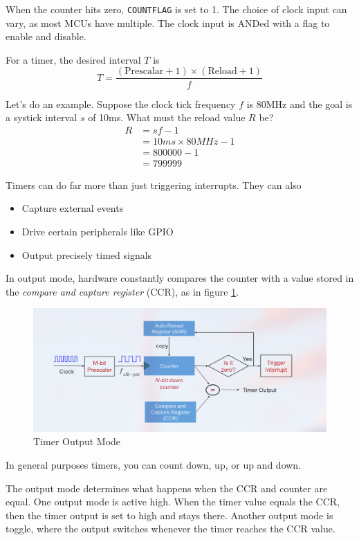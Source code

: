When the counter hits zero, \texttt{COUNTFLAG} is set to 1.
The choice of clock input can vary, as most MCUs have multiple.
The clock input is ANDed with a flag to enable and disable.

For a timer, the desired interval $T$ is
\begin{equation}
    T = \frac{(\text{Prescalar} + 1) \times (\text{Reload} + 1)}{f}
\end{equation}

Let's do an example. Suppose the clock tick frequency $f$ is
80MHz and the goal is a systick
interval $s$ of 10ms. What must the reload value $R$ be?
\begin{align}
    R & = sf - 1                \\
      & = 10ms \times 80MHz - 1 \\
      & = 800000 - 1            \\
      & = 799999
\end{align}

Timers can do far more than just triggering interrupts.
They can also
\begin{itemize}
    \item Capture external events
    \item Drive certain peripherals like GPIO
    \item Output precisely timed signals
\end{itemize}
In output mode, hardware constantly compares the
counter with a value stored in the \emph{compare and capture register}
(CCR), as in figure
\ref{fig:outputmodetimer}.

\begin{figure}
    \includegraphics{images/outputmodetimer.png}
    \caption{Timer Output Mode}
    \label{fig:outputmodetimer}
\end{figure}

In general purposes timers, you can count down, up, or up and
down.

The output mode determines what happens when the CCR and counter
are equal. One output mode is active high. When the
timer value equals the CCR, then the timer output is set to high
and stays there. Another output mode is toggle, where the
output switches whenever the timer reaches the CCR value.

